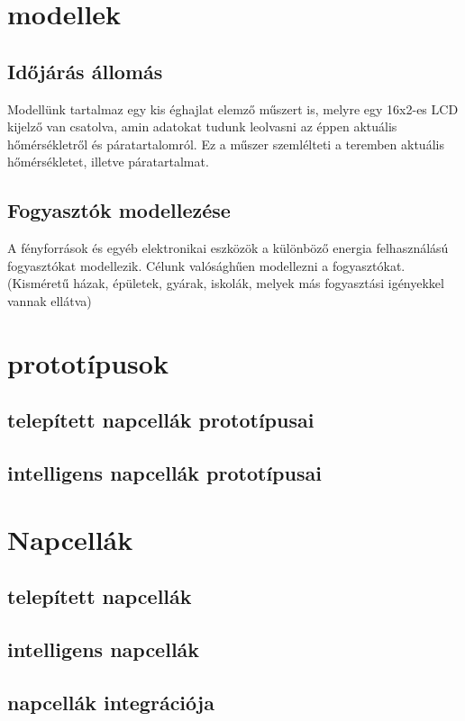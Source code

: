 \documentclass[
]{thesis-ekf}
\theoremstyle{definition}
\theoremstyle{remark}
\begin{document}
	\section{modellek}
		\subsection{Időjárás állomás}
			\par Modellünk tartalmaz egy kis éghajlat elemző műszert is, melyre egy 16x2-es LCD kijelző van csatolva, amin adatokat tudunk leolvasni az éppen aktuális hőmérsékletről és páratartalomról. Ez a műszer szemlélteti a teremben aktuális hőmérsékletet, illetve páratartalmat.
		\subsection{Fogyasztók modellezése}
			\par A fényforrások és egyéb elektronikai eszközök a különböző energia felhasználású fogyasztókat modellezik. Célunk valósághűen modellezni a fogyasztókat. (Kisméretű házak, épületek, gyárak, iskolák, melyek más fogyasztási igényekkel vannak ellátva)
			
	\section{prototípusok}
		\subsection{telepített napcellák prototípusai}
		\subsection{intelligens napcellák prototípusai}
 	\section{Napcellák}
 		\subsection{telepített napcellák}
 		\subsection{intelligens napcellák}
 		\subsection{napcellák integrációja}
\end{document}
